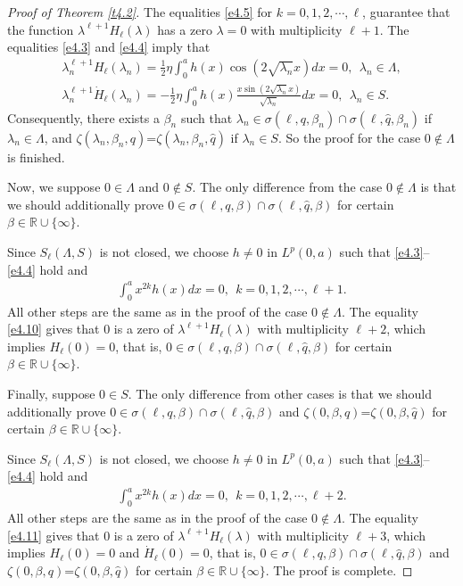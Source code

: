 \documentclass[reqno,12pt,centertags]{amsart}
\numberwithin{equation}{section}
\theoremstyle{definition}
\begin{document}
\begin{proof}[Proof of Theorem \ref{t4.2}]
The equalities \eqref{e4.5} for $k=0,1,2, \cdots, \ell$, guarantee that the function $\lambda^{\ell+1}H_{\ell}(\lambda)$ has a zero $\lambda=0$ with multiplicity $\ell+1$. 
The equalities \eqref{e4.3} and \eqref{e4.4} imply that 
\begin{align*}
\lambda_n^{\ell+1} H_{\ell}(\lambda_n)
=\frac{1}{2}\eta\int_{0}^{a}h(x)\cos(2\sqrt{\lambda_n}x)dx=0, ~~\lambda_n \in \Lambda, \\
\lambda_n^{\ell+1}\dot{H}_{\ell}(\lambda_n)
=-\frac{1}{2}\eta\int_{0}^{a}h(x) \frac{x\sin(2\sqrt{\lambda_n}x)}{\sqrt{\lambda_n}}dx=0, 
~~\lambda_n \in S .
\end{align*}
Consequently, there exists a $\beta_n$ such that $\lambda_n \in \sigma(\ell, q, \beta_n) \cap \sigma(\ell, \hat{q}, \beta_n)$ if $\lambda_n \in \Lambda$, and
$\zeta(\lambda_{n},\beta_{n}, q)$=$\zeta(\lambda_{n},\beta_{n}, \hat{q})$
if $\lambda_n \in S$. 
So the proof for the case $0 \notin \Lambda$ is finished.

Now, we suppose $0 \in \Lambda$ and $0 \notin S$. The only difference from the case $0 \notin \Lambda$ is that we should additionally prove 
$0\in\sigma(\ell,q,\beta)\cap\sigma(\ell,\hat{q},\beta)$ for certain $\beta\in\mathbb{R}\cup\{\infty\}$.

Since $S_{\ell}(\Lambda, S)$ is not closed, we choose $h \neq 0$ in $L^p(0, a)$ such that \eqref{e4.3}--\eqref{e4.4} hold and
\begin{align}\label{e4.10}
\int_{0}^{a} x^{2k}h(x)dx=0, 
~~k=0,1,2, \cdots, \ell+1.
\end{align}
All other steps are the same as in the proof of the case $0 \notin \Lambda$. The equality \eqref{e4.10} gives that $0$ is a zero of $\lambda^{\ell+1}H_{\ell}(\lambda)$ with multiplicity $\ell+2$, which implies $H_{\ell}(0)=0$, that is,  
$0\in\sigma(\ell,q,\beta)\cap\sigma(\ell,\hat{q},\beta)$ for certain $\beta\in\mathbb{R}\cup\{\infty\}$.

Finally, suppose $0\in S$. The only difference from other cases is that we should additionally prove $0\in \sigma(\ell, q, \beta) \cap \sigma(\ell, \hat{q}, \beta)$ and $\zeta(0,\beta, q)$=$\zeta(0,\beta, \hat{q})$ for certain $\beta\in\mathbb{R}\cup\{\infty\}$.

Since $S_{\ell}(\Lambda, S)$ is not closed, we choose $h \neq 0$ in $L^p(0, a)$ such that \eqref{e4.3}--\eqref{e4.4} hold and
\begin{align}\label{e4.11}
\int_{0}^{a} x^{2k}h(x)dx=0, 
~~k=0,1,2, \cdots, \ell+2.
\end{align}
All other steps are the same as in the proof of the case $0 \notin \Lambda$. The equality \eqref{e4.11} gives that $0$ is a zero of $\lambda^{\ell+1}H_{\ell}(\lambda)$ with multiplicity $\ell+3$, which implies $H_{\ell}(0)=0$ and $\dot{H}_{\ell}(0)=0$, that is,  
$0\in\sigma(\ell,q,\beta)\cap\sigma(\ell,\hat{q},\beta)$
and 
$\zeta(0,\beta, q)$=$\zeta(0,\beta, \hat{q})$ for certain $\beta\in\mathbb{R}\cup\{\infty\}$. The proof is complete.
\end{proof}
\end{document}
